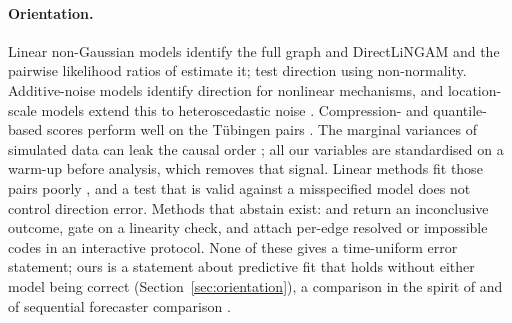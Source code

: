 \paragraph{Orientation.} Linear non-Gaussian models identify the full graph
\citep{shimizu2006linear} and DirectLiNGAM \citep{shimizu2011directlingam} and
the pairwise likelihood ratios of \citet{hyvarinen2013pairwise} estimate it;
\citet{shimizu2008use} test direction using non-normality. Additive-noise models
\citep{hoyer2009nonlinear,peters2014identifiability} identify direction for
nonlinear mechanisms, and location-scale models extend this to heteroscedastic
noise \citep{xu2022heci,immer2023loci}. Compression- and quantile-based scores
\citep{marx2017slope,tagasovska2020bqcd} perform well on the Tübingen pairs
\citep{mooij2016distinguishing}. The marginal variances of simulated data can leak the causal order
\citep{reisach2021beware}; all our variables are standardised on a warm-up before
analysis, which removes that signal. Linear methods fit those pairs poorly
\citep{schkoda2025goodness}, and a test that is valid against a misspecified
model does not control direction error. Methods that abstain exist:
\citet{prakash2024diagnostic} and \citet{ding2025gaussdetect} return an
inconclusive outcome, \citet{prakash2026power} gate on a linearity check, and
\citet{uehara2026iterative} attach per-edge resolved or impossible codes in an
interactive protocol. None of these gives a time-uniform error statement; ours
is a statement about predictive fit that holds without either model being
correct (Section~\ref{sec:orientation}), a comparison in the spirit of
\citet{vuong1989likelihood} and of sequential forecaster comparison
\citep{choe2024comparing}.
